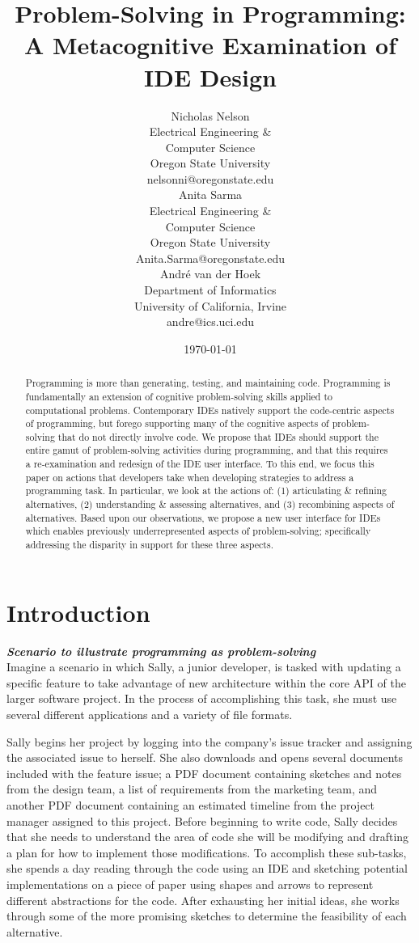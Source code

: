 \documentclass{ppig}
\title{Problem-Solving in Programming: A Metacognitive Examination of IDE Design}
\author{Nicholas Nelson \\
  Electrical Engineering \&\\ Computer Science \\
  Oregon State University \\
  nelsonni@oregonstate.edu \\
  \And
  Anita Sarma \\
  Electrical Engineering \&\\ Computer Science \\
  Oregon State University \\
  Anita.Sarma@oregonstate.edu \\
  \And
  André van der Hoek \\
  Department of Informatics \\
  University of California, Irvine \\
  andre@ics.uci.edu
}
\date{\today}
\newcommand{\bold}[1]{\textit{\textbf{\color{aoblue}#1}}}
\begin{document}
\maketitle
\thispagestyle{empty}

\begin{abstract}

Programming is more than generating, testing, and maintaining code.
Programming is fundamentally an extension of cognitive problem-solving skills applied to computational problems.
Contemporary IDEs natively support the code-centric aspects of programming, but forego supporting many of the cognitive aspects of problem-solving that do not directly involve code.
We propose that IDEs should support the entire gamut of problem-solving activities during programming, and that this requires a re-examination and redesign of the IDE user interface.
To this end, we focus this paper on actions that developers take when developing strategies to address a programming task.
In particular, we look at the actions of: (1) articulating \& refining alternatives, (2) understanding \& assessing alternatives, and (3) recombining aspects of alternatives.
Based upon our observations, we propose a new user interface for IDEs which enables previously underrepresented aspects of problem-solving; specifically addressing the disparity in support for these three aspects. 
\end{abstract}

\section{Introduction}
\bold{Scenario to illustrate programming as problem-solving\\}
Imagine a scenario in which Sally, a junior developer, is tasked with updating a specific feature to take advantage of new architecture within the core API of the larger software project. In the process of accomplishing this task, she must use several different applications and a variety of file formats.

Sally begins her project by logging into the company's issue tracker and assigning the associated issue to herself.
She also downloads and opens several documents included with the feature issue; a PDF document containing sketches and notes from the design team, a list of requirements from the marketing team, and another PDF document containing an estimated timeline from the project manager assigned to this project.
Before beginning to write code, Sally decides that she needs to understand the area of code she will be modifying and drafting a plan for how to implement those modifications.
To accomplish these sub-tasks, she spends a day reading through the code using an IDE and sketching potential implementations on a piece of paper using shapes and arrows to represent different abstractions for the code.
After exhausting her initial ideas, she works through some of the more promising sketches to determine the feasibility of each alternative.
\end{document}
